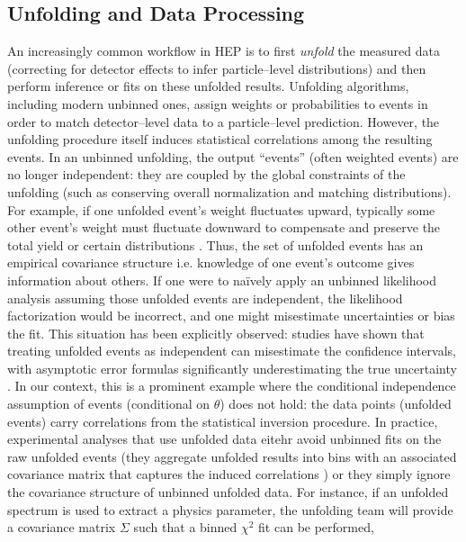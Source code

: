     \subsection{Unfolding and Data Processing}
        An increasingly common workflow in HEP is to first \emph{unfold} the measured data (correcting for detector effects to infer particle--level distributions) and then perform inference or fits on these unfolded results.
        Unfolding algorithms, including modern unbinned ones, assign weights or probabilities to events in order to match detector--level data to a particle--level prediction.
        However, the unfolding procedure itself induces statistical correlations among the resulting events.
        In an unbinned unfolding, the output “events” (often weighted events) are no longer independent: they are coupled by the global constraints of the unfolding (such as conserving overall normalization and matching distributions).
        For example, if one unfolded event’s weight fluctuates upward, typically some other event’s weight must fluctuate downward to compensate and preserve the total yield or certain distributions .
        Thus, the set of unfolded events has an empirical covariance structure i.e. knowledge of one event’s outcome gives information about others.
        If one were to naïvely apply an unbinned likelihood analysis assuming those unfolded events are independent, the likelihood factorization would be incorrect, and one might misestimate uncertainties or bias the fit.
        This situation has been explicitly observed: studies have shown that treating unfolded events as independent can misestimate the confidence intervals, with asymptotic error formulas significantly underestimating the true uncertainty .
        In our context, this is a prominent example where the conditional independence assumption of events (conditional on $\theta$) does not hold: the data points (unfolded events) carry correlations from the statistical inversion procedure.
        In practice, experimental analyses that use unfolded data eitehr avoid unbinned fits on the raw unfolded events (they aggregate unfolded results into bins with an associated covariance matrix that captures the induced correlations ) or they simply ignore the covariance structure of unbinned unfolded data.\kd{}
        For instance, if an unfolded spectrum is used to extract a physics parameter, the unfolding team will provide a covariance matrix $\Sigma$ such that a binned $\chi^2$ fit can be performed,
